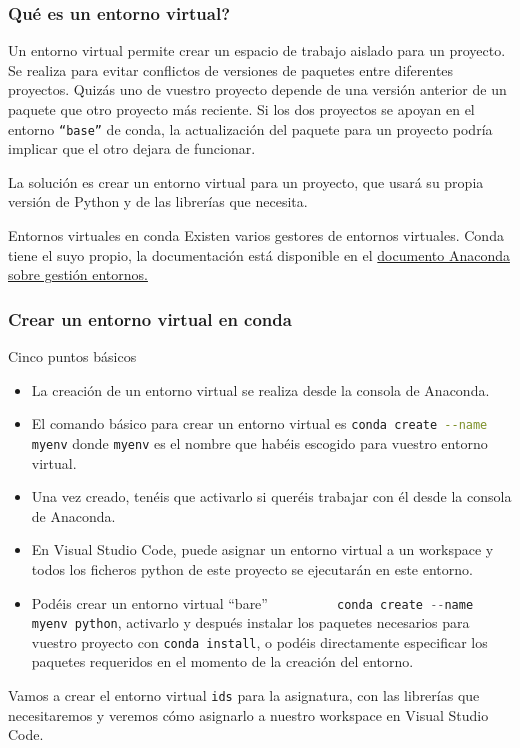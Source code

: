 \documentclass[9pt]{beamer}
\newcommand{\inlinecode}[2][Python]{\lstinline[language=#1, basicstyle=\color{mycodecolor}]{#2}}
\begin{document}
\begin{frame}
  \frametitle{Qué es un entorno virtual?}
  \begin{block}{}
    Un entorno virtual permite crear un espacio de trabajo aislado
    para un proyecto. Se realiza para evitar conflictos de versiones de
    paquetes entre diferentes proyectos. Quizás uno de vuestro
    proyecto depende de una versión anterior de un paquete que otro
    proyecto más reciente. Si los dos proyectos se apoyan en el
    entorno {\tt ``base''} de conda, la actualización del paquete para un
    proyecto podría implicar que el otro dejara de funcionar. 
    
  \end{block}\pause

  La solución es crear un entorno virtual para un proyecto, que usará
  su propia versión de Python y de las librerías que necesita.\\
  \pause

  \begin{block}{Entornos virtuales en conda}
    Existen varios gestores de entornos virtuales. Conda tiene el
    suyo propio, la documentación está disponible en el
    \href{https://docs.conda.io/projects/conda/en/latest/user-guide/tasks/manage-environments.html}{documento
      Anaconda sobre gestión entornos.}
    
  \end{block}
\end{frame}
\begin{frame}
  \frametitle{Crear un entorno virtual en conda}
  \begin{block}{Cinco puntos básicos}
    \begin{itemize}
    \item La creación de un entorno virtual se realiza desde la
      consola de Anaconda.
    \item El comando básico para crear un entorno virtual es
      \inlinecode[bash]{conda create --name myenv} donde {\tt myenv}
      es el nombre que habéis escogido para vuestro entorno virtual.
    \item Una vez creado, tenéis que activarlo si queréis trabajar con
      él desde la consola de Anaconda.
    \item En Visual Studio Code, puede asignar un entorno virtual a un
      workspace y todos los ficheros python de este proyecto se
      ejecutarán en este entorno.
    \item Podéis crear un entorno virtual ``bare''  \inlinecode{
        conda create --name myenv python}, activarlo y después instalar los
      paquetes necesarios para vuestro proyecto con  \inlinecode[bash]{conda install},
      o podéis directamente especificar los paquetes requeridos en el
      momento de la creación del entorno.
    \end{itemize}    
  \end{block}\pause
  Vamos a crear el entorno virtual \inlinecode[bash]{ids} para la
  asignatura, con las librerías que necesitaremos y veremos cómo
  asignarlo a nuestro workspace en Visual Studio Code.
\end{frame}
\end{document}
